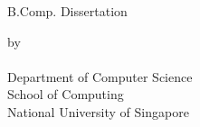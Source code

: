 \makeatletter
\begin{titlepage}
\begin{center}

B.Comp. Dissertation 
\\[7cm]
\uppercase{\textbf{\large{\@title}}}

\vfill
by
\\[1cm]

\@author
\\[3cm]

Department of Computer Science \\
School of Computing \\
National University of Singapore \\
\@date

\end{center}
\end{titlepage}
\makeatother